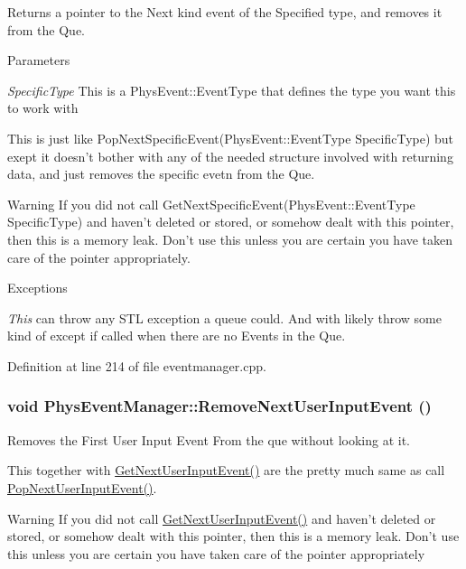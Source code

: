 Returns a pointer to the Next kind event of the Specified type, and removes it from the Que. 


\begin{DoxyParams}{Parameters}
\item[{\em SpecificType}]This is a PhysEvent::EventType that defines the type you want this to work with\end{DoxyParams}
This is just like PopNextSpecificEvent(PhysEvent::EventType SpecificType) but exept it doesn't bother with any of the needed structure involved with returning data, and just removes the specific evetn from the Que. \begin{DoxyWarning}{Warning}
If you did not call GetNextSpecificEvent(PhysEvent::EventType SpecificType) and haven't deleted or stored, or somehow dealt with this pointer, then this is a memory leak. Don't use this unless you are certain you have taken care of the pointer appropriately. 
\end{DoxyWarning}

\begin{DoxyExceptions}{Exceptions}
\item[{\em This}]can throw any STL exception a queue could. And with likely throw some kind of except if called when there are no Events in the Que. \end{DoxyExceptions}


Definition at line 214 of file eventmanager.cpp.

\hypertarget{classPhysEventManager_a9c6f5296c9961fa469ebe06d7599283a}{
\subsubsection[{RemoveNextUserInputEvent}]{\setlength{\rightskip}{0pt plus 5cm}void PhysEventManager::RemoveNextUserInputEvent ()}}
\label{d5/dd7/classPhysEventManager_a9c6f5296c9961fa469ebe06d7599283a}


Removes the First User Input Event From the que without looking at it. 

This together with \hyperlink{classPhysEventManager_a4874a9b1138d2351bf28e527a66c02b8}{GetNextUserInputEvent()} are the pretty much same as call \hyperlink{classPhysEventManager_ad6612a6e1c728941e2c467e7f136ca51}{PopNextUserInputEvent()}. \begin{DoxyWarning}{Warning}
If you did not call \hyperlink{classPhysEventManager_a4874a9b1138d2351bf28e527a66c02b8}{GetNextUserInputEvent()} and haven't deleted or stored, or somehow dealt with this pointer, then this is a memory leak. Don't use this unless you are certain you have taken care of the pointer appropriately 
\end{DoxyWarning}

